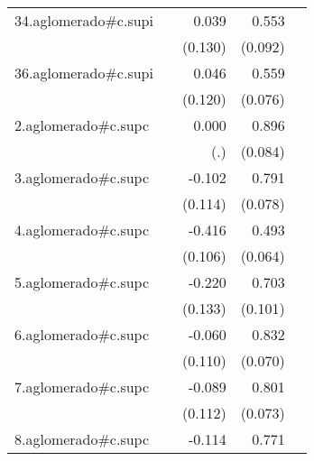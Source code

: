 {\begin{longtable}{l*{4}{D{.}{.}{-1}}}
\addlinespace
34.aglomerado#c.supi&                     &       0.039         &       0.553\sym{***}&                     \\
            &                     &     (0.130)         &     (0.092)         &                     \\
\addlinespace
36.aglomerado#c.supi&                     &       0.046         &       0.559\sym{***}&                     \\
            &                     &     (0.120)         &     (0.076)         &                     \\
\addlinespace
2.aglomerado#c.supc&                     &       0.000         &       0.896\sym{***}&                     \\
            &                     &         (.)         &     (0.084)         &                     \\
\addlinespace
3.aglomerado#c.supc&                     &      -0.102         &       0.791\sym{***}&                     \\
            &                     &     (0.114)         &     (0.078)         &                     \\
\addlinespace
4.aglomerado#c.supc&                     &      -0.416\sym{***}&       0.493\sym{***}&                     \\
            &                     &     (0.106)         &     (0.064)         &                     \\
\addlinespace
5.aglomerado#c.supc&                     &      -0.220         &       0.703\sym{***}&                     \\
            &                     &     (0.133)         &     (0.101)         &                     \\
\addlinespace
6.aglomerado#c.supc&                     &      -0.060         &       0.832\sym{***}&                     \\
            &                     &     (0.110)         &     (0.070)         &                     \\
\addlinespace
7.aglomerado#c.supc&                     &      -0.089         &       0.801\sym{***}&                     \\
            &                     &     (0.112)         &     (0.073)         &                     \\
\addlinespace
8.aglomerado#c.supc&                     &      -0.114         &       0.771\sym{***}&                     \\

\end{longtable}}
